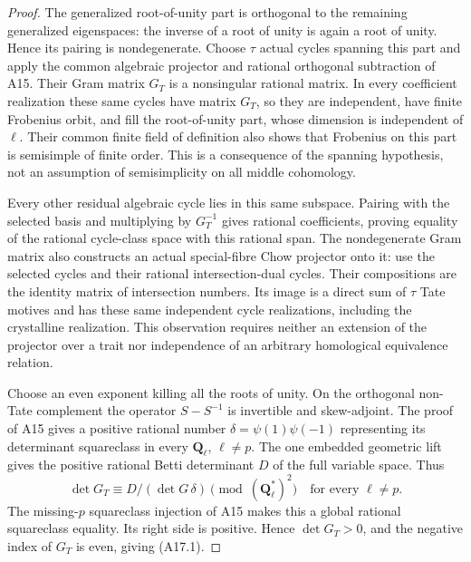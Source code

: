 \documentclass[11pt]{article}
\theoremstyle{remark}\newtheorem{remark}[theorem]{Remark}
\begin{document}
\begin{proof}
The generalized root-of-unity part is orthogonal to the
remaining generalized eigenspaces: the inverse of a root
of unity is again a root of unity. Hence its pairing is
nondegenerate. Choose $\tau$ actual cycles spanning this
part and apply the common algebraic projector and rational
orthogonal subtraction of A15. Their Gram matrix $G_T$
is a nonsingular rational matrix. In every coefficient
realization these same cycles have matrix $G_T$, so they
are independent, have finite Frobenius orbit, and fill the
root-of-unity part, whose dimension is independent of
$\ell$. Their common finite field of definition also shows
that Frobenius on this part is semisimple of finite order.
This is a consequence of the spanning hypothesis, not an
assumption of semisimplicity on all middle cohomology.

Every other residual algebraic cycle lies in this same
subspace. Pairing with the selected basis and multiplying
by $G_T^{-1}$ gives rational coefficients, proving equality
of the rational cycle-class space with this rational span.
The nondegenerate Gram matrix also constructs an actual
special-fibre Chow projector onto it: use the selected
cycles and their rational intersection-dual cycles.
Their compositions are the identity matrix of intersection
numbers. Its image is a direct sum of $\tau$ Tate motives
and has these same independent cycle realizations, including
the crystalline realization. This observation requires
neither an extension of the projector over a trait nor
independence of an arbitrary homological equivalence relation.

Choose an even exponent killing all the roots of unity.
On the orthogonal non-Tate complement the operator
$S-S^{-1}$ is invertible and skew-adjoint. The proof of
A15 gives a positive rational number
$\delta=\psi(1)\psi(-1)$ representing its determinant
squareclass in every $\mathbf Q_\ell$, $\ell\ne p$.
The one embedded geometric lift gives the positive
rational Betti determinant $D$ of the full variable space.
Thus
\[
             \det G_T\equiv D/(\det G\,\delta)
                     \pmod{(\mathbf Q_\ell^*)^2}
                    \quad\text{for every }\ell\ne p.
\]
The missing-$p$ squareclass injection of A15 makes this
a global rational squareclass equality. Its right side
is positive. Hence $\det G_T>0$, and the negative index
of $G_T$ is even, giving (A17.1).
\end{proof}
\end{document}
